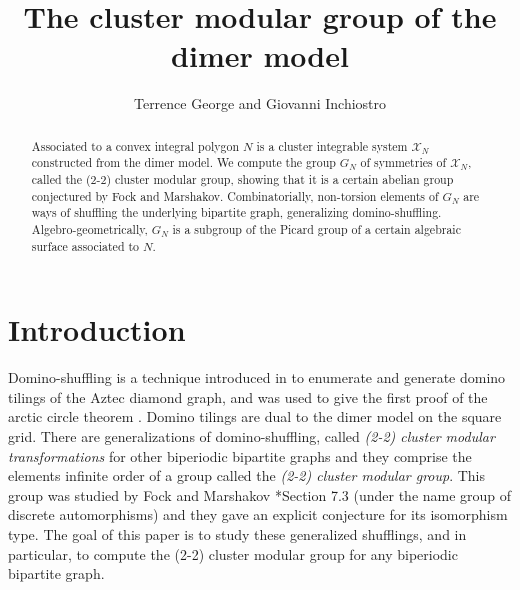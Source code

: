 \documentclass[11pt]{article} %
\theoremstyle{definition}
\begin{document}

 
\title{The cluster modular group of the dimer model}
\author{Terrence George and Giovanni Inchiostro}

\newcommand{\Addresses}{{%
  \bigskip
  \footnotesize
  \textsc{Brown University\\Providence, RI-02906,USA}\\
  \textit{E-mail address}: \texttt{georgete@umich.edu}\\
  \textit{E-mail address}: \texttt{ginchios@uw.edu}
}}

\maketitle
\begin{abstract}
     Associated to a convex integral polygon $N$ is a  cluster integrable system $\mathcal X_N$ constructed from the dimer model. We compute the group $G_N$ of symmetries of $\mathcal X_N$, called the (2-2) cluster modular group, showing that it is a certain abelian group conjectured by Fock and Marshakov. Combinatorially, non-torsion elements of $G_N$ are ways of shuffling the underlying bipartite graph, generalizing domino-shuffling. Algebro-geometrically, $G_N$ is a subgroup of the Picard group of a certain algebraic surface associated to $N$. 
 \end{abstract}



\section{Introduction}
Domino-shuffling is a technique introduced in \cite{EKLP} to enumerate and generate domino tilings of the Aztec diamond graph, and was used to give the first proof of the arctic circle theorem \cite{JPS}. Domino tilings are dual to the dimer model on the square grid. There are generalizations of domino-shuffling, called \textit{(2-2) cluster modular transformations} for other biperiodic bipartite graphs and they comprise the elements infinite order of a group called the \textit{(2-2) cluster modular group}. This group was studied by Fock and Marshakov \cite{FM16}*{Section 7.3} (under the name group of discrete automorphisms) and they gave an explicit conjecture for its isomorphism type. The goal of this paper is to study these generalized shufflings, and in particular, to compute the (2-2) cluster modular group for any biperiodic bipartite graph. %
\end{document}
